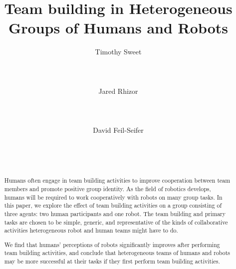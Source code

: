 \documentclass{acm_proc_article-sp}
\begin{document}
\title{Team building in Heterogeneous Groups of Humans and Robots}

\author{
\alignauthor
Timothy Sweet\\
       \\
       \\
       \\
\alignauthor
Jared Rhizor\\
       \\
       \\
       \\
\alignauthor
David Feil-Seifer\\
       \\
       \\
       \\
}

\maketitle
\begin{abstract}
Humans often engage in team building activities to improve cooperation between team members and promote positive group identity. As the field of robotics develops, humans will be required to work cooperatively with robots on many group tasks. In this paper, we explore the effect of team building activities on a group consisting of three agents: two human participants and one robot. The team building and primary tasks are chosen to be simple, generic, and representative of the kinds of collaborative activities heterogeneous robot and human teams might have to do.

We find that humans' perceptions of robots significantly improves after performing team building activities, and conclude that heterogeneous teams of humans and robots may be more successful at their tasks if they first perform team building activities.
\end{abstract}

\end{document}
